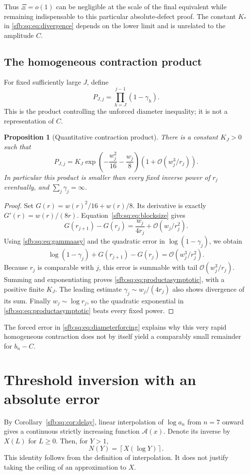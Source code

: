 \documentclass[11pt]{article}
\newtheorem{proposition}[theorem]{Proposition}
\theoremstyle{remark}\newtheorem{remark}[theorem]{Remark}
\newcommand{\OO}{\mathcal O}
\newcommand{\ceil}[1]{\left\lceil #1\right\rceil}
\begin{document}
Thus $\Xi=o(1)$ can be negligible at the scale of the final equivalent while remaining indispensable to this particular absolute-defect proof. The constant $K_*$ in \eqref{sfb:sq:eq:divergence} depends on the lower limit and is unrelated to the amplitude $C$.

\subsection{The homogeneous contraction product}
For fixed sufficiently large $J$, define
\begin{equation}\label{sfb:sq:eq:contractionproduct}
 P_{J,j}=\prod_{h=J}^{j-1}(1-\gamma_h).
\end{equation}
This is the product controlling the unforced diameter inequality; it is not a representation of $C$.

\begin{proposition}[Quantitative contraction product]\label{sfb:sq:prop:product}
There is a constant $K_J>0$ such that
\begin{equation}\label{sfb:sq:eq:productasymptotic}
 P_{J,j}=K_J\exp\!\left(-\frac{w_j^2}{16}-\frac{w_j}{8}\right)
       \left(1+\OO(w_j^3/r_j)\right).
\end{equation}
In particular this product is smaller than every fixed inverse power of $r_j$ eventually, and $\sum_j\gamma_j=\infty$.
\end{proposition}
\begin{proof}
Set $G(r)=w(r)^2/16+w(r)/8$. Its derivative is exactly
$G'(r)=w(r)/(8r)$. Equation~\eqref{sfb:sq:eq:blocksize} gives
\[
 G(r_{j+1})-G(r_j)=\frac{w_j}{4r_j}+\OO(w_j/r_j^2).
\]
Using \eqref{sfb:sq:eq:gammaasy} and the quadratic error in $\log(1-\gamma_j)$, we obtain
\[
 \log(1-\gamma_j)+G(r_{j+1})-G(r_j)
     =\OO(w_j^3/r_j^2).
\]
Because $r_j$ is comparable with $j$, this error is summable with tail $\OO(w_j^3/r_j)$. Summing and exponentiating proves \eqref{sfb:sq:eq:productasymptotic}, with a positive finite $K_J$. The leading estimate $\gamma_j\sim w_j/(4r_j)$ also shows divergence of its sum. Finally $w_j\sim\log r_j$, so the quadratic exponential in \eqref{sfb:sq:eq:productasymptotic} beats every fixed power.
\end{proof}

The forced error in \eqref{sfb:sq:eq:diameterforcing} explains why this very rapid homogeneous contraction does not by itself yield a comparably small remainder for $b_n-C$.

\section{Threshold inversion with an absolute error}\label{sfb:sq:sec:inverse}
By Corollary~\ref{sfb:sq:cor:delay}, linear interpolation of $\log a_n$ from $n=7$ onward gives a continuous strictly increasing function $\mathcal A(x)$. Denote its inverse by $X(L)$ for $L\ge0$. Then, for $Y>1$,
\begin{equation}\label{sfb:sq:eq:exactceiling}
 N(Y)=\ceil{X(\log Y)}.
\end{equation}
This identity follows from the definition of interpolation. It does not justify taking the ceiling of an approximation to $X$.
\end{document}
